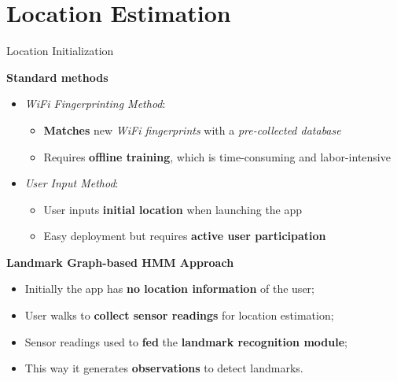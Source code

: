 \section[Esteem]{Location Estimation}

\begin{frame}{Location Initialization}
    
    \textbf{Standard methods}
    
    \begin{itemize}
        \item \textit{WiFi Fingerprinting Method}:
            \begin{itemize}
                \item \textbf{Matches} new \textit{WiFi fingerprints} with a \textit{pre-collected database}
                \item Requires \textbf{offline training}, which is time-consuming and labor-intensive
            \end{itemize}    
        \item \textit{User Input Method}:
            \begin{itemize}
                \item User inputs \textbf{initial location} when launching the app
                \item Easy deployment but requires \textbf{active user participation}
            \end{itemize}
    \end{itemize}
    
    \textbf{Landmark Graph-based HMM Approach}
    \begin{itemize}
        \item Initially the app has \textbf{no location information} of the user;
        \item User walks to \textbf{collect sensor readings} for location estimation;
        \item Sensor readings used to \textbf{fed} the \textbf{landmark recognition module};
        \item This way it generates \textbf{observations} to detect landmarks.
    \end{itemize}

\end{frame}